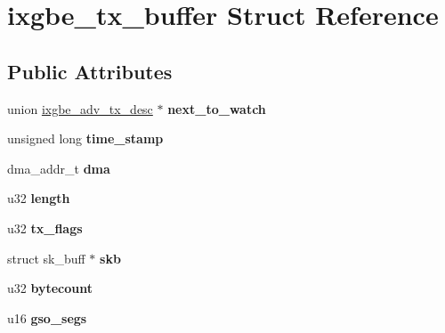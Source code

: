 \hypertarget{structixgbe__tx__buffer}{
\section{ixgbe\_\-tx\_\-buffer Struct Reference}
\label{structixgbe__tx__buffer}
}
\subsection*{Public Attributes}
\begin{DoxyCompactItemize}
\item 
\hypertarget{structixgbe__tx__buffer_a384cb23847d8768063e407e6246571e2}{
union \hyperlink{unionixgbe__adv__tx__desc}{ixgbe\_\-adv\_\-tx\_\-desc} $\ast$ {\bfseries next\_\-to\_\-watch}}
\label{structixgbe__tx__buffer_a384cb23847d8768063e407e6246571e2}

\item 
\hypertarget{structixgbe__tx__buffer_a02f3dcfe090fcd209803b00261d3e425}{
unsigned long {\bfseries time\_\-stamp}}
\label{structixgbe__tx__buffer_a02f3dcfe090fcd209803b00261d3e425}

\item 
\hypertarget{structixgbe__tx__buffer_a2884d10e047adbef38bc76ab70a917ca}{
dma\_\-addr\_\-t {\bfseries dma}}
\label{structixgbe__tx__buffer_a2884d10e047adbef38bc76ab70a917ca}

\item 
\hypertarget{structixgbe__tx__buffer_a3ed0a72d90f124497cb7bd016f66c433}{
u32 {\bfseries length}}
\label{structixgbe__tx__buffer_a3ed0a72d90f124497cb7bd016f66c433}

\item 
\hypertarget{structixgbe__tx__buffer_ac6375e3d19e7de1fd98eda6d51a09cab}{
u32 {\bfseries tx\_\-flags}}
\label{structixgbe__tx__buffer_ac6375e3d19e7de1fd98eda6d51a09cab}

\item 
\hypertarget{structixgbe__tx__buffer_ac389665dd73e079e99dae40922ac9979}{
struct sk\_\-buff $\ast$ {\bfseries skb}}
\label{structixgbe__tx__buffer_ac389665dd73e079e99dae40922ac9979}

\item 
\hypertarget{structixgbe__tx__buffer_ad0421a9bf82453efd37e5126ff7ebf32}{
u32 {\bfseries bytecount}}
\label{structixgbe__tx__buffer_ad0421a9bf82453efd37e5126ff7ebf32}

\item 
\hypertarget{structixgbe__tx__buffer_af56f82a7aabc9556d0ed2fc1073cfa63}{
u16 {\bfseries gso\_\-segs}}
\label{structixgbe__tx__buffer_af56f82a7aabc9556d0ed2fc1073cfa63}

\end{DoxyCompactItemize}


